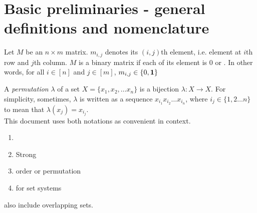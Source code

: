 \section{Basic preliminaries - general definitions and nomenclature}
\label{sec:basicprelim}

\begin{definition}
  \label{def:binmatrix}
  Let $M$ be an $n \times m$ matrix. $m_{i,j}$ denotes its $(i,j)$th
  element, i.e. element at $i$th row and $j$th column. $M$ is a binary
  matrix if each of its element is 0 or \un.
  In other words, for all $i \in [n]$ and $j \in [m]$, $m_{i,j} \in
  \{0, \textbf{1}\}$ 
\end{definition}

\begin{definition}
  A {\em permutation} $\lambda$ of a set $X = \{x_1, x_2, \ldots
  x_n\}$ is a bijection $\lambda: X \rightarrow X$.  For simplicity,
  sometimes, $\lambda$ is written as a sequence $x_{i_1}x_{i_2}\ldots
  x_{i_n}$, where $i_j \in \{1, 2 \ldots n\}$ to mean that
  $\lambda(x_j)= x_{i_j}$.\\
  This document uses both notations as convenient in context.
\end{definition}

\begin{definition}[\emph{\Cop}]
    \label{def:copmatrix}
  \begin{enumerate}
  \item \Cop
  \item Strong \cop
  \item \Cop order or \cop permutation
  \item \Cop for set systems
  \end{enumerate}
\end{definition}

\figcopmatrix
{}

\begin{definition}[\emph{\Crop}]
  \label{def:cropmatrix}
\end{definition}

\begin{definition}
    \label{def:setsystem}

    also include overlapping sets.
\end{definition}

\begin{definition}
  \label{def:graphtree}  
\end{definition}

